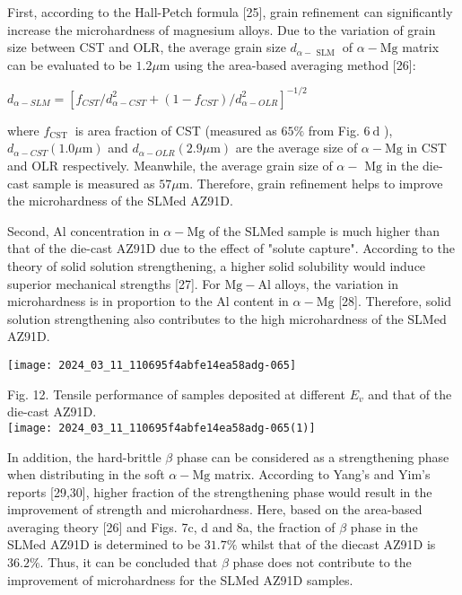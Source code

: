 \documentclass[10pt]{article}
\begin{document}
First, according to the Hall-Petch formula [25], grain refinement can significantly increase the microhardness of magnesium alloys. Due to the variation of grain size between CST and OLR, the average grain size $d_{\alpha-\text { SLM }}$ of $\alpha-\mathrm{Mg}$ matrix can be evaluated to be $1.2 \mu \mathrm{m}$ using the area-based averaging method [26]:

$d_{\alpha-S L M}=\left[f_{C S T} / d_{\alpha-C S T}^{2}+\left(1-f_{C S T}\right) / d_{\alpha-O L R}^{2}\right]^{-1 / 2}$

where $f_{\text {CST }}$ is area fraction of CST (measured as $65 \%$ from Fig. $6 \mathrm{~d}$ ), $d_{\alpha-C S T}(1.0 \mu \mathrm{m})$ and $d_{\alpha-O L R}(2.9 \mu \mathrm{m})$ are the average size of $\alpha-\mathrm{Mg}$ in CST and OLR respectively. Meanwhile, the average grain size of $\alpha-$ $\mathrm{Mg}$ in the die-cast sample is measured as $57 \mu \mathrm{m}$. Therefore, grain refinement helps to improve the microhardness of the SLMed AZ91D.

Second, Al concentration in $\alpha-\mathrm{Mg}$ of the SLMed sample is much higher than that of the die-cast AZ91D due to the effect of "solute capture". According to the theory of solid solution strengthening, a higher solid solubility would induce superior mechanical strengths [27]. For $\mathrm{Mg}-\mathrm{Al}$ alloys, the variation in microhardness is in proportion to the $\mathrm{Al}$ content in $\alpha-\mathrm{Mg}$ [28]. Therefore, solid solution strengthening also contributes to the high microhardness of the SLMed AZ91D.

\begin{center}
\texttt{[image: 2024\_03\_11\_110695f4abfe14ea58adg-065]}
\end{center}

Fig. 12. Tensile performance of samples deposited at different $E_{v}$ and that of the die-cast AZ91D.\\
\texttt{[image: 2024\_03\_11\_110695f4abfe14ea58adg-065(1)]}

In addition, the hard-brittle $\beta$ phase can be considered as a strengthening phase when distributing in the soft $\alpha-\mathrm{Mg}$ matrix. According to Yang's and Yim's reports [29,30], higher fraction of the strengthening phase would result in the improvement of strength and microhardness. Here, based on the area-based averaging theory [26] and Figs. 7c, d and 8a, the fraction of $\beta$ phase in the SLMed AZ91D is determined to be $31.7 \%$ whilst that of the diecast AZ91D is $36.2 \%$. Thus, it can be concluded that $\beta$ phase does not contribute to the improvement of microhardness for the SLMed AZ91D samples.
\end{document}
